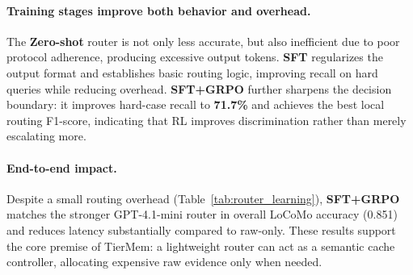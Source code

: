 \documentclass{article}
\theoremstyle{plain}
\theoremstyle{definition}
\theoremstyle{remark}
\begin{document}
\paragraph{Training stages improve both behavior and overhead.}
The \textbf{Zero-shot} router is not only less accurate, but also inefficient due to poor protocol adherence, producing excessive output tokens.
\textbf{SFT} regularizes the output format and establishes basic routing logic, improving recall on hard queries while reducing overhead.
\textbf{SFT+GRPO} further sharpens the decision boundary: it improves hard-case recall to \textbf{71.7\%} and achieves the best local routing F1-score, indicating that RL improves discrimination rather than merely escalating more.

\paragraph{End-to-end impact.}
Despite a small routing overhead (Table~\ref{tab:router_learning}), \textbf{SFT+GRPO} matches the stronger GPT-4.1-mini router in overall LoCoMo accuracy (0.851) and reduces latency substantially compared to raw-only.
These results support the core premise of TierMem: a lightweight router can act as a semantic cache controller, allocating expensive raw evidence only when needed.
\end{document}
